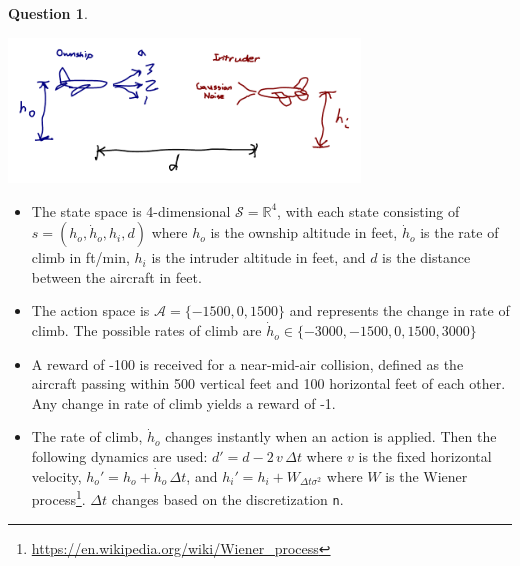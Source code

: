 \documentclass{article}
\theoremstyle{definition}
\newtheorem{question}[thm]{Question}
\newcommand{\reals}{\mathbb{R}}
\begin{document}
\begin{question}
\begin{center}
    \includegraphics[width=0.7\textwidth]{unresponsive_acas.pdf}
\end{center}

\begin{itemize}
    \item The state space is 4-dimensional $\mathcal{S} = \reals^4$, with each state consisting of $s=(h_o, \dot{h}_o, h_i, d)$ where $h_o$ is the ownship altitude in feet, $\dot{h}_o$ is the rate of climb in ft/min, $h_i$ is the intruder altitude in feet, and $d$ is the distance between the aircraft in feet.
    \item The action space is $\mathcal{A}=\{-1500, 0, 1500\}$ and represents the change in rate of climb. The possible rates of climb are $\dot{h}_o \in \{-3000, -1500, 0, 1500, 3000\}$
    \item A reward of -100 is received for a near-mid-air collision, defined as the aircraft passing within 500 vertical feet and 100 horizontal feet of each other. Any change in rate of climb yields a reward of -1.
    \item The rate of climb, $\dot{h}_o$ changes instantly when an action is applied. Then the following dynamics are used: $d' = d - 2\,v\,\Delta t$ where $v$ is the fixed horizontal velocity, $h_o' = h_o + \dot{h}_o\,\Delta t$, and $h_i' = h_i + W_{\Delta t \sigma^2}$ where $W$ is the Wiener process\footnote{\url{https://en.wikipedia.org/wiki/Wiener_process}}. $\Delta t$ changes based on the discretization \texttt{n}.
\end{itemize}

\end{question}
\end{document}
